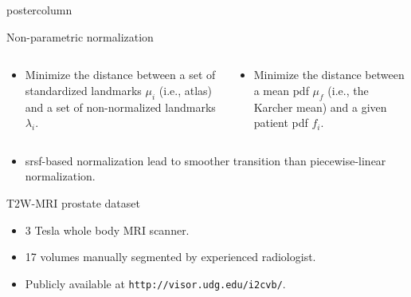 \documentclass[final, size=a0]{beamer}
\begin{document}
\begin{frame}
\begin{columns}
\begin{column}{.33\textwidth}
\begin{beamercolorbox}[center,wd=\textwidth]{postercolumn}
\begin{minipage}[T]{.95\textwidth}
{\begin{alertblock}{Non-parametric normalization}
              \begin{columns}
                \begin{column}{.5\textwidth}
                  \begin{itemize}
                  \justifying
                  \item Minimize the distance between a set of standardized landmarks $\mu_i$ (i.e., atlas) and a set of non-normalized landmarks $\lambda_i$.
                  \end{itemize}
                \end{column}
                \begin{column}{.5\textwidth}
                  \begin{itemize}
                    \justifying
                  \item Minimize the distance between a mean \acs{pdf} $\mu_f$ (i.e., the Karcher mean) and a given patient \ac{pdf} $f_i$.
                  \end{itemize}
                \end{column}
              \end{columns}

              \vspace{1cm}

              \begin{itemize}
                \justifying
              \item \acs{srsf}-based normalization lead to smoother transition than piecewise-linear normalization.
              \end{itemize}

            \end{alertblock}

            \vspace{.2cm}

            \begin{block}{T2W-MRI prostate dataset}
              \begin{itemize}
                \justifying
              \item 3 Tesla whole body MRI scanner.
              \item 17 volumes manually segmented by experienced radiologist.
              \item Publicly available at \texttt{http://visor.udg.edu/i2cvb/}.
              \end{itemize}


\end{block}}
\end{minipage}
\end{beamercolorbox}
\end{column}
\end{columns}
\end{frame}
\end{document}
